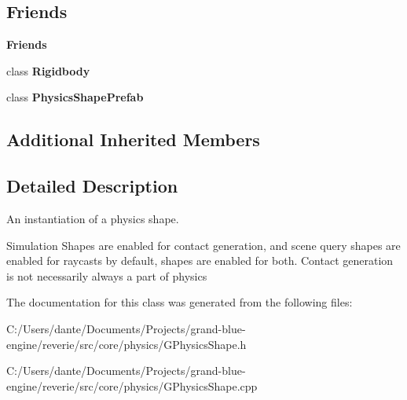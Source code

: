 \subsection*{Friends}
\begin{Indent}\textbf{ Friends}\par
\begin{DoxyCompactItemize}
\item 
\mbox{\label{classrev_1_1_physics_shape_ab9677fbc0a8849136cf78204d65c4935}} 
class {\bfseries Rigidbody}
\item 
\mbox{\label{classrev_1_1_physics_shape_a9881a4ed7014790bc7a68fecdb9b646a}} 
class {\bfseries Physics\+Shape\+Prefab}
\end{DoxyCompactItemize}
\end{Indent}
\subsection*{Additional Inherited Members}


\subsection{Detailed Description}
An instantiation of a physics shape. 

Simulation Shapes are enabled for contact generation, and scene query shapes are enabled for raycasts by default, shapes are enabled for both. Contact generation is not necessarily always a part of physics 

The documentation for this class was generated from the following files\+:\begin{DoxyCompactItemize}
\item 
C\+:/\+Users/dante/\+Documents/\+Projects/grand-\/blue-\/engine/reverie/src/core/physics/G\+Physics\+Shape.\+h\item 
C\+:/\+Users/dante/\+Documents/\+Projects/grand-\/blue-\/engine/reverie/src/core/physics/G\+Physics\+Shape.\+cpp\end{DoxyCompactItemize}
